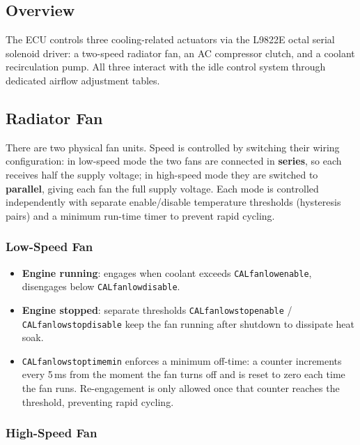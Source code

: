 \documentclass[a4paper,11pt]{article}
\renewcommand{\_}{\oldunderscore\allowbreak}
\begin{document}
\subsection{Overview}

The ECU controls three cooling-related actuators via the L9822E octal serial
solenoid driver: a two-speed radiator fan, an AC compressor clutch, and a
coolant recirculation pump. All three interact with the idle control system
through dedicated airflow adjustment tables.

\subsection{Radiator Fan}

There are two physical fan units. Speed is controlled by switching their
wiring configuration: in low-speed mode the two fans are connected in
\textbf{series}, so each receives half the supply voltage; in high-speed
mode they are switched to \textbf{parallel}, giving each fan the full
supply voltage. Each mode is controlled independently with separate
enable/disable temperature thresholds (hysteresis pairs) and a minimum
run-time timer to prevent rapid cycling.

\subsubsection*{Low-Speed Fan}

\begin{itemize}
\item \textbf{Engine running}: engages when coolant exceeds
      \texttt{CAL\_fan\_low\_enable}, disengages below
      \texttt{CAL\_fan\_low\_disable}.
\item \textbf{Engine stopped}: separate thresholds
      \texttt{CAL\_fan\_low\_stop\_enable} / \texttt{CAL\_fan\_low\_stop\_disable}
      keep the fan running after shutdown to dissipate heat soak.
\item \texttt{CAL\_fan\_low\_stop\_time\_min} enforces a minimum off-time: a
      counter increments every 5\,ms from the moment the fan turns off and is
      reset to zero each time the fan runs. Re-engagement is only allowed once
      that counter reaches the threshold, preventing rapid cycling.
\end{itemize}

\subsubsection*{High-Speed Fan}
\end{document}
